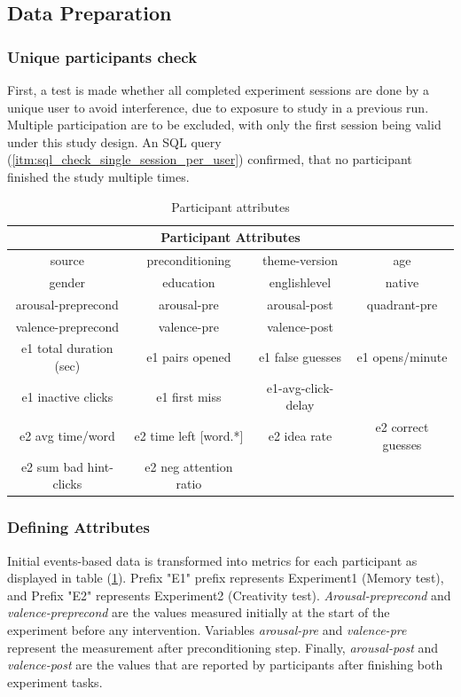 	
	
	\subsection{Data Preparation}
	
	\subsubsection{Unique participants check} First, a test is made whether all completed experiment sessions are done by a unique user to avoid interference, due to exposure to study in a previous run. Multiple participation are to be excluded, with only the first session being valid under this study design. An SQL query (\ref{itm:sql_check_single_session_per_user}) confirmed, that no participant finished the study multiple times.
	
	\begin{table}
		\begin{center}
			\begin{tabular}{|c|c|c|c|}
				\hline
				\multicolumn{4}{|c|}{Participant Attributes} \\ 
				\hline 
				source & preconditioning & theme-version & age \\ 
				\hline 
				gender & education & englishlevel & native \\ 
				\hline 
				arousal-preprecond & arousal-pre & arousal-post & quadrant-pre \\ 
				\hline 
				valence-preprecond & valence-pre & valence-post & \\ 
				\hline 
				e1 total duration (sec) & e1 pairs opened & e1 false guesses & e1 opens/minute \\ 
				\hline 
				e1 inactive clicks & e1 first miss & e1-avg-click-delay &  \\ 
				\hline 
				e2 avg time/word & e2 time left [word.*]  & e2 idea rate & e2 correct guesses \\
				\hline
				e2 sum bad hint-clicks & e2 neg attention ratio & & \\
				\hline
			\end{tabular} 
		\end{center}
		\caption{Participant attributes}
		\label{fig:participant_attributes}
	\end{table}

	\subsubsection{Defining Attributes} Initial events-based data is transformed into metrics for each participant as displayed in table (\ref{fig:participant_attributes}). Prefix "E1" prefix represents Experiment1 (Memory test), and Prefix "E2" represents Experiment2 (Creativity test). \textit{Arousal-preprecond} and \textit{valence-preprecond} are the values measured initially at the start of the experiment before any intervention. Variables \textit{arousal-pre} and \textit{valence-pre} represent the measurement after preconditioning step. Finally, \textit{arousal-post} and \textit{valence-post} are the values that are reported by participants after finishing both experiment tasks.

